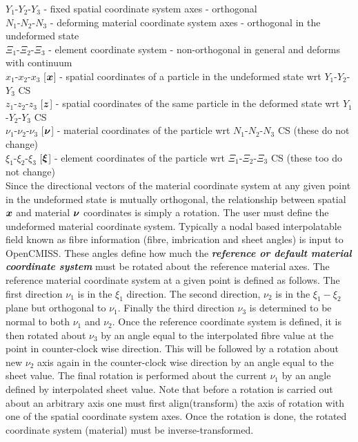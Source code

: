 \noindent $Y_{1}$-$Y_{2}$-$Y_{3}$ - fixed spatial coordinate system axes - orthogonal\\
$N_{1}$-$N_{2}$-$N_{3}$ - deforming material coordinate system axes  - orthogonal in the undeformed state\\
$\Xi_{1}$-$\Xi_{2}$-$\Xi_{3}$ - element coordinate system - non-orthogonal in general and deforms with continuum\\

\noindent $x_{1}$-$x_{2}$-$x_{3}$ [$\vect{x}$] - spatial coordinates of a particle in the undeformed state wrt $Y_{1}$-$Y_{2}$-$Y_{3}$ CS \\
$z_{1}$-$z_{2}$-$z_{3}$ [$\vect{z}$] - spatial coordinates of the same particle in the deformed state wrt $Y_{1}$-$Y_{2}$-$Y_{3}$ CS \\
$\nu_{1}$-$\nu_{2}$-$\nu_{3}$ [$\vect{\nu}$] - material coordinates of the particle wrt $N_{1}$-$N_{2}$-$N_{3}$ CS (these do not change) \\
$\xi_{1}$-$\xi_{2}$-$\xi_{3}$ [$\vect{\xi}$] - element coordinates of the particle wrt $\Xi_{1}$-$\Xi_{2}$-$\Xi_{3}$ CS (these too do not change)\\

Since the directional vectors of the material coordinate system at any given
point in the undeformed state is mutually orthogonal, the relationship between
spatial $\vect{x}$ and material $\vect{\nu}$ coordinates is simply a
rotation. The user must define the undeformed material coordinate
system. Typically a nodal based interpolatable field known as fibre
information (fibre, imbrication and sheet angles) is input to OpenCMISS. These
angles define how much the \textit{\textbf{reference or default material
    coordinate system}} must be rotated about the reference material axes. The
reference material coordinate system at a given point is defined as
follows. The first direction $\nu_{1}$ is in the $\xi_{1}$ direction. The
second direction, $\nu_{2}$ is in the $\xi_{1}-\xi_{2}$ plane but orthogonal
to $\nu_{1}$. Finally the third direction $\nu_{3}$ is determined to be normal
to both $\nu_{1}$ and $\nu_{2}$. Once the reference coordinate system is
defined, it is then rotated about $\nu_{3}$ by an angle equal to the
interpolated fibre value at the point in counter-clock wise direction. This
will be followed by a rotation about new $\nu_{2}$ axis again in the
counter-clock wise direction by an angle equal to the sheet value. The final
rotation is performed about the current $\nu_{1}$ by an angle defined by
interpolated sheet value. Note that before a rotation is carried out about an
arbitrary axis one must first align(transform) the axis of rotation with one
of the spatial coordinate system axes. Once the rotation is done, the rotated
coordinate system (material) must be inverse-transformed.

